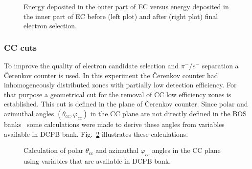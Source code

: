 \begin{figure}
\begin{center} 
\caption{\small Energy deposited in the outer part of EC versus energy deposited in the inner part of EC before (left plot) and after (right plot) final electron selection. \label{fig_eout_ein}} 
\end{center}
\end{figure}

 

\subsubsection{CC cuts}
\label{cc_cuts} 

To improve the quality of electron candidate selection and $\pi^{-}/e^{-}$ separation a \v Cerenkov counter is used. In this experiment the \v Cerenkov counter had inhomogeneously distributed zones with partially low detection efficiency. For that purpose a geometrical cut for the removal of CC low efficiency zones is established. This cut is defined in the plane of \v Cerenkov counter. 
Since polar and azimuthal angles $(\theta_{cc},\varphi_{cc})$ in the CC plane are not directly defined in the BOS banks~\cite{BOS:bank} some calculations were made to derive these angles from variables available in DCPB bank. Fig.~\ref{fig:cc_plane_def} illustrates these calculations.

\begin{figure}[htp]
\begin{center}
\caption{\small  Calculation of polar $\theta_{cc}$ and azimuthal $\varphi_{cc}$  angles in the CC plane using variables that are available in DCPB bank.} \label{fig:cc_plane_def}
\end{center}
\end{figure}


